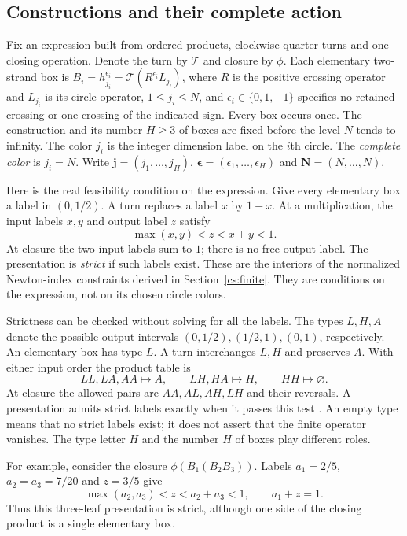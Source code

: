 \documentclass[11pt]{article}
\theoremstyle{remark}\newtheorem{remark}[theorem]{Remark}
\numberwithin{equation}{section}
\newcommand{\Turn}{\mathcal T}
\begin{document}
\subsection{Constructions and their complete action}
Fix an expression built from ordered products, clockwise quarter turns
and one closing operation. Denote the turn by $\Turn$ and closure by
$\phi$. Each elementary two-strand box is
\(B_i=h_{j_i}^{\epsilon_i}=\Turn(R^{\epsilon_i}L_{j_i})\), where $R$ is the positive crossing operator and \(L_{j_i}\) is its circle
operator, \(1\le j_i\le N\), and \(\epsilon_i\in\{0,1,-1\}\) specifies
no retained crossing or one crossing of the indicated sign. Every box
occurs once. The construction and its number \(H\ge3\) of boxes are
fixed before the level \(N\) tends to infinity. The color $j_i$ is the
integer dimension label on the $i$th circle. The \emph{complete color} is
$j_i=N$. Write $\mathbf j=(j_1,\ldots,j_H)$,
$\boldsymbol\epsilon=(\epsilon_1,\ldots,\epsilon_H)$ and
$\mathbf N=(N,\ldots,N)$.

Here is the real feasibility condition on the expression. Give every
elementary box a label in $(0,1/2)$. A turn replaces a label $x$ by $1-x$.
At a multiplication, the input labels $x,y$ and output label $z$ satisfy
\[
 \max(x,y)<z<x+y<1.
\]
At closure the two input labels sum to $1$; there is no free output
label. The presentation is \emph{strict} if such labels exist. These are
the interiors of the normalized Newton-index constraints derived in
Section~\ref{cs:finite}. They are conditions on the expression, not on
its chosen circle colors.

Strictness can be checked without solving for all the labels.
The types \(L,H,A\) denote the possible output intervals
\((0,1/2),(1/2,1),(0,1)\), respectively.
An elementary box has type \(L\). A turn interchanges \(L,H\) and
preserves \(A\). With either input order the product table is
\[
 LL,LA,AA\longmapsto A,\qquad
 LH,HA\longmapsto H,\qquad HH\longmapsto\varnothing.
\]
At closure the allowed pairs are \(AA,AL,AH,LH\) and their reversals.
A presentation admits strict labels exactly when it passes this test
\cite[Lemma 5.2]{Newton}. An empty type means that no strict labels
exist; it does not assert that the finite operator vanishes. The type
letter \(H\) and the number $H$ of boxes play different roles.

For example, consider the closure $\phi(B_1(B_2B_3))$. Labels
$a_1=2/5$, $a_2=a_3=7/20$ and $z=3/5$ give
\[
 \max(a_2,a_3)<z<a_2+a_3<1,\qquad a_1+z=1.
\]
Thus this three-leaf presentation is strict, although one side of the
closing product is a single elementary box.
\end{document}
